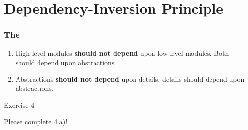 \documentclass[9pt]{beamer}
\begin{document}
\section{Dependency-Inversion Principle}
\begin{frame}
  \frametitle{The \secname}
  \begin{theorem}
    \begin{enumerate}
    \item High level modules \textbf{should not depend} upon low
      level modules. Both should depend upon abstractions.
    \item Abstractions \textbf{should not depend} upon details. details
      should depend upon abstractions.
    \end{enumerate}
  \end{theorem}
\pause
\vfill
\begin{exampleblock}{Exercise 4}
  \begin{center}
    Please complete 4 a)!
  \end{center}
\end{exampleblock}
\end{frame}
\end{document}

